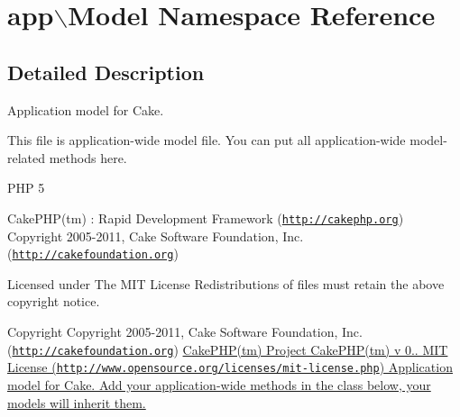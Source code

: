 \hypertarget{namespaceapp_1_1Model}{
\section{app$\backslash$\-Model \-Namespace \-Reference}
\label{namespaceapp_1_1Model}
}


\subsection{\-Detailed \-Description}
\-Application model for \-Cake.

\-This file is application-\/wide model file. \-You can put all application-\/wide model-\/related methods here.

\-P\-H\-P 5

\-Cake\-P\-H\-P(tm) \-: \-Rapid \-Development \-Framework (\href{http://cakephp.org}{\tt http\-://cakephp.\-org}) \-Copyright 2005-\/2011, \-Cake \-Software \-Foundation, \-Inc. (\href{http://cakefoundation.org}{\tt http\-://cakefoundation.\-org})

\-Licensed under \-The \-M\-I\-T \-License \-Redistributions of files must retain the above copyright notice.

\begin{DoxyCopyright}{\-Copyright}
\-Copyright 2005-\/2011, \-Cake \-Software \-Foundation, \-Inc. (\href{http://cakefoundation.org}{\tt http\-://cakefoundation.\-org}) \hyperlink{}{\-Cake\-P\-H\-P(tm) \-Project   \-Cake\-P\-H\-P(tm) v 0..  \-M\-I\-T \-License (\href{http://www.opensource.org/licenses/mit-license.php}{\tt http\-://www.\-opensource.\-org/licenses/mit-\/license.\-php})  \-Application model for \-Cake.  \-Add your application-\/wide methods in the class below, your models will inherit them. }
\end{DoxyCopyright}
